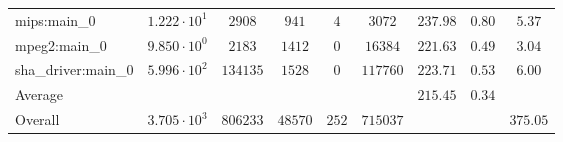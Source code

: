 \begin{tabular}{|l|c|c|c|c|c|c|c|c|}
mips:main\_0            & $ 1.222 \cdot 10^{1}  $ & $ 2908   $ & $ 941   $ & $ 4   $ & $ 3072   $ & $ 237.98      $ & $ 0.80    $ & $ 5.37    $ \\
mpeg2:main\_0           & $ 9.850 \cdot 10^{0}  $ & $ 2183   $ & $ 1412  $ & $ 0   $ & $ 16384  $ & $ 221.63      $ & $ 0.49    $ & $ 3.04    $ \\
sha\_driver:main\_0     & $ 5.996 \cdot 10^{2}  $ & $ 134135 $ & $ 1528  $ & $ 0   $ & $ 117760 $ & $ 223.71      $ & $ 0.53    $ & $ 6.00    $ \\
\hline
Average                 & $                     $ & $        $ & $       $ & $     $ & $        $ & $ 215.45      $ & $ 0.34    $ & $         $ \\
\hline
Overall                 & $ 3.705 \cdot 10^{3}  $ & $ 806233 $ & $ 48570 $ & $ 252 $ & $ 715037 $ & $             $ & $         $ & $ 375.05  $ \\
\hline
\end{tabular}
